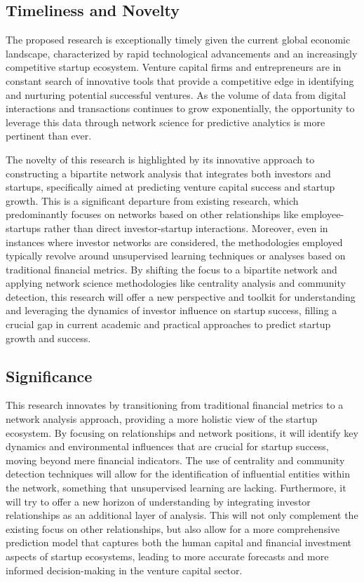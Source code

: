 \documentclass[a4paper,11pt]{article}
\begin{document}
\subsection{Timeliness and Novelty}

The proposed research is exceptionally timely given the current global economic landscape, characterized by rapid technological advancements and an increasingly competitive startup ecosystem. Venture capital firms and entrepreneurs are in constant search of innovative tools that provide a competitive edge in identifying and nurturing potential successful ventures. As the volume of data from digital interactions and transactions continues to grow exponentially, the opportunity to leverage this data through network science for predictive analytics is more pertinent than ever.

The novelty of this research is highlighted by its innovative approach to constructing a bipartite network analysis that integrates both investors and startups, specifically aimed at predicting venture capital success and startup growth. This is a significant departure from existing research, which predominantly focuses on networks based on other relationships like employee-startups rather than direct investor-startup interactions. Moreover, even in instances where investor networks are considered, the methodologies employed typically revolve around unsupervised learning techniques or analyses based on traditional financial metrics. By shifting the focus to a bipartite network and applying network science methodologies like centrality analysis and community detection, this research will offer a new perspective and toolkit for understanding and leveraging the dynamics of investor influence on startup success, filling a crucial gap in current academic and practical approaches to predict startup growth and success.

\subsection{Significance}

This research innovates by transitioning from traditional financial metrics to a network analysis approach, providing a more holistic view of the startup ecosystem. By focusing on relationships and network positions, it will identify key dynamics and environmental influences that are crucial for startup success, moving beyond mere financial indicators. The use of centrality and community detection techniques will allow for the identification of influential entities within the network, something that unsupervised learning are lacking. Furthermore, it will try to offer a new horizon of understanding by integrating investor relationships as an additional layer of analysis. This will not only complement the existing focus on other relationships, but also allow for a more comprehensive prediction model that captures both the human capital and financial investment aspects of startup ecosystems, leading to more accurate forecasts and more informed decision-making in the venture capital sector.
\end{document}
